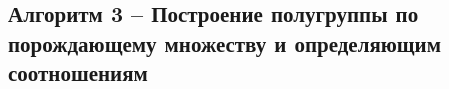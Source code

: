 \documentclass[bachelor, och, labwork]{shiza}
\begin{document}



        \subsection{Алгоритм 3 -- Построение полугруппы по порождающему множеству и определяющим соотношениям}
\end{document}
